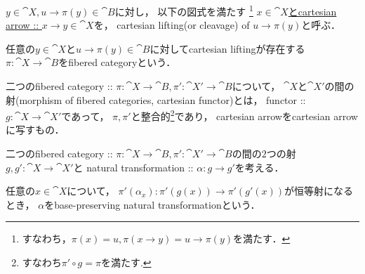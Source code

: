 \documentclass[a4paper, dvipdfmx]{jsarticle}
\begin{document}
\begin{Def}
\begin{myenum}
\item
    $y \in \cat{X}, u \to \pi(y) \in \cat{B}$に対し，
    以下の図式を満たす
    \footnote{すなわち，$\pi(x)=u, \pi(x \to y)=u \to \pi(y)$を満たす．}
    \underline{$x \in \cat{X}$とcartesian arrow :: $x \to y \in \cat{X}$}を，
    cartesian lifting(or cleavage) of $u \to \pi(y)$と呼ぶ．
    \begin{center}
    \end{center}

\item
    任意の$y \in \cat{X}$と$u \to \pi(y) \in \cat{B}$に対してcartesian liftingが存在する
    $\pi \colon \cat{X} \to \cat{B}$をfibered categoryという．

\item
    二つのfibered category :: 
    $\pi \colon \cat{X} \to \cat{B}, \pi' \colon \cat{X}' \to \cat{B}$について，
    $\cat{X}$と$\cat{X}'$の間の射(morphism of fibered categories, cartesian functor)とは，
    functor :: $g \colon \cat{X} \to \cat{X}'$であって，
    $\pi, \pi'$と整合的\footnote{ すなわち$\pi' \circ g=\pi$を満たす. }であり，
    cartesian arrowをcartesian arrowに写すもの．

\item
    二つのfibered category :: 
    $\pi \colon \cat{X} \to \cat{B}, \pi' \colon \cat{X}' \to \cat{B}$の間の$2$つの射
    $g,g' \colon \cat{X} \to \cat{X}'$と
    natural transformation :: $\alpha \colon g \to g'$を考える．
    \begin{center}
    \end{center}
    任意の$x \in \cat{X}$について，
    $\pi'(\alpha_x) \colon \pi'(g(x)) \to \pi'(g'(x))$が恒等射になるとき，
    $\alpha$をbase-preserving natural transformationという．
\end{myenum}
\end{Def}
\end{document}

